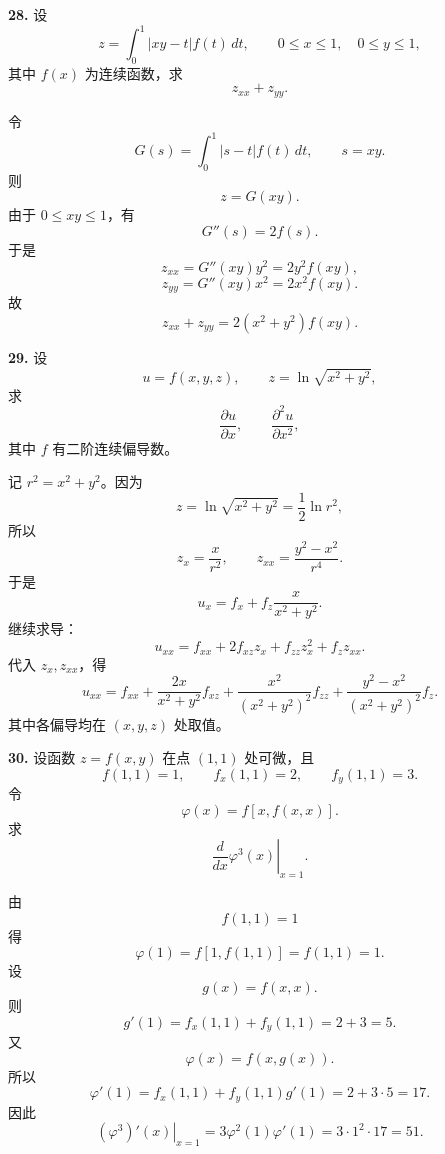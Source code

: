 \begin{problemblock}
\textbf{28.} 设
\[
z=\int_0^1|xy-t|f(t)\,dt,\qquad 0\le x\le1,\quad0\le y\le1,
\]
其中 \(f(x)\) 为连续函数，求
\[
z_{xx}+z_{yy}.
\]
\end{problemblock}

\begin{solutionblock}
令
\[
G(s)=\int_0^1|s-t|f(t)\,dt,\qquad s=xy.
\]
则
\[
z=G(xy).
\]
由于 \(0\le xy\le1\)，有
\[
G''(s)=2f(s).
\]
于是
\[
z_{xx}=G''(xy)y^2=2y^2f(xy),
\]
\[
z_{yy}=G''(xy)x^2=2x^2f(xy).
\]
故
\[
\boxed{z_{xx}+z_{yy}=2(x^2+y^2)f(xy)}.
\]
\end{solutionblock}

\begin{problemblock}
\textbf{29.} 设
\[
u=f(x,y,z),\qquad z=\ln\sqrt{x^2+y^2},
\]
求
\[
\frac{\partial u}{\partial x},\qquad \frac{\partial^2u}{\partial x^2},
\]
其中 \(f\) 有二阶连续偏导数。
\end{problemblock}

\begin{solutionblock}
记 \(r^2=x^2+y^2\)。因为
\[
z=\ln\sqrt{x^2+y^2}=\frac12\ln r^2,
\]
所以
\[
z_x=\frac{x}{r^2},\qquad
z_{xx}=\frac{y^2-x^2}{r^4}.
\]
于是
\[
\boxed{u_x=f_x+f_z\frac{x}{x^2+y^2}}.
\]
继续求导：
\[
u_{xx}=f_{xx}+2f_{xz}z_x+f_{zz}z_x^2+f_z z_{xx}.
\]
代入 \(z_x,z_{xx}\)，得
\[
\boxed{
u_{xx}=f_{xx}
+\frac{2x}{x^2+y^2}f_{xz}
+\frac{x^2}{(x^2+y^2)^2}f_{zz}
+\frac{y^2-x^2}{(x^2+y^2)^2}f_z }.
\]
其中各偏导均在 \((x,y,z)\) 处取值。
\end{solutionblock}

\begin{problemblock}
\textbf{30.} 设函数 \(z=f(x,y)\) 在点 \((1,1)\) 处可微，且
\[
f(1,1)=1,\qquad f_x(1,1)=2,\qquad f_y(1,1)=3.
\]
令
\[
\varphi(x)=f[x,f(x,x)].
\]
求
\[
\left.\frac{d}{dx}\varphi^3(x)\right|_{x=1}.
\]
\end{problemblock}

\begin{solutionblock}
由
\[
f(1,1)=1
\]
得
\[
\varphi(1)=f[1,f(1,1)]=f(1,1)=1.
\]
设
\[
g(x)=f(x,x).
\]
则
\[
g'(1)=f_x(1,1)+f_y(1,1)=2+3=5.
\]
又
\[
\varphi(x)=f(x,g(x)).
\]
所以
\[
\varphi'(1)=f_x(1,1)+f_y(1,1)g'(1)
=2+3\cdot5=17.
\]
因此
\[
\left.(\varphi^3)'(x)\right|_{x=1}
=3\varphi^2(1)\varphi'(1)
=3\cdot1^2\cdot17
=\boxed{51}.
\]
\end{solutionblock}

